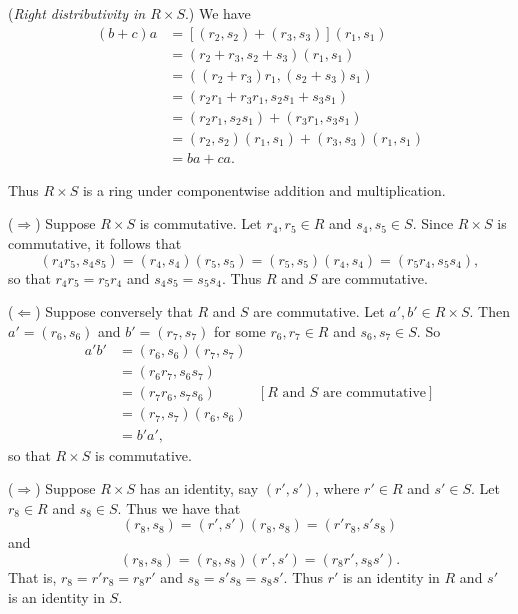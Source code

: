 \begin{enumerate}
      (\textit{Right distributivity in $R \times S$}.) We have
      \begin{align*}
         (b + c)a &= [(r_2, s_2) + (r_3, s_3)](r_1, s_1) \\
            &= (r_2 + r_3, s_2 + s_3)(r_1, s_1) \\
            &= ((r_2 + r_3)r_1, (s_2 + s_3)s_1) \\
            &= (r_2r_1 + r_3r_1, s_2s_1 + s_3s_1) \\
            &= (r_2r_1, s_2s_1) + (r_3r_1, s_3s_1) \\
            &= (r_2, s_2)(r_1, s_1) + (r_3, s_3)(r_1, s_1) \\
            &= ba + ca.
      \end{align*}

      Thus $R \times S$ is a ring under componentwise addition and
      multiplication.

      ($\Rightarrow$) Suppose $R \times S$ is commutative. Let $r_4, r_5 \in R$
      and $s_4, s_5 \in S$. Since $R \times S$ is commutative, it follows that
      $$(r_4r_5, s_4s_5) = (r_4, s_4)(r_5, s_5) = (r_5, s_5)(r_4, s_4) =
        (r_5r_4, s_5s_4),$$
      so that $r_4r_5 = r_5r_4$ and $s_4s_5 = s_5s_4$. Thus $R$ and $S$ are
      commutative.

      ($\Leftarrow$) Suppose conversely that $R$ and $S$ are commutative. Let
      $a', b' \in R \times S$. Then $a' = (r_6, s_6)$ and $b' = (r_7, s_7)$ for
      some $r_6, r_7 \in R$ and $s_6, s_7 \in S$. So
      \begin{align*}
         a'b' &= (r_6, s_6)(r_7, s_7) \\
            &= (r_6r_7, s_6s_7) \\
            &= (r_7r_6, s_7s_6) &[R \text{ and } S \text{ are commutative}] \\
            &= (r_7, s_7)(r_6, s_6) \\
            &= b'a',
      \end{align*}
      so that $R \times S$ is commutative.

      ($\Rightarrow$) Suppose $R \times S$ has an identity, say $(r', s')$,
      where $r' \in R$ and $s' \in S$. Let $r_8 \in R$ and $s_8 \in S$. Thus we
      have that
      $$(r_8, s_8) = (r', s')(r_8, s_8) = (r'r_8, s's_8)$$
      and
      $$(r_8, s_8) = (r_8, s_8)(r', s') = (r_8r', s_8s').$$
      That is, $r_8 = r'r_8 = r_8r'$ and $s_8 = s's_8 = s_8s'$. Thus $r'$ is an
      identity in $R$ and $s'$ is an identity in $S$.


\end{enumerate}
